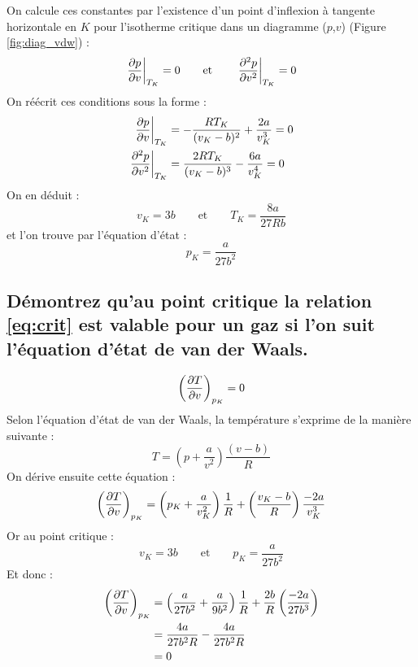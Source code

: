 On calcule ces constantes par l'existence d'un point d'inflexion à tangente horizontale en $K$ pour l'isotherme critique dans un diagramme ($p$,$v$) (Figure \ref{fig:diag_vdw}) : 
\begin{equation} \left.\frac{\partial p}{\partial v}\right|_{T_K} = 0 \qquad \text{et} \qquad \left.\frac{\partial^2 p}{\partial v^2}\right|_{T_K} = 0 \end{equation}
On réécrit ces conditions sous la forme :
\begin{align} \left.\frac{\partial p}{\partial v}\right|_{T_K} &= -\frac{RT_K}{(v_K - b)^2} + \frac{2a}{v^3_K} = 0 \\ \left.\frac{\partial^2 p}{\partial v^2}\right|_{T_K} &= \frac{2RT_K}{(v_K - b)^3} - \frac{6a}{v^4_K} = 0 \end{align}
On en déduit :
\begin{equation} v_K = 3b \qquad \text{et} \qquad T_K = \frac{8a}{27Rb} \end{equation}
et l'on trouve par l'équation d'état :
\begin{equation} p_K = \frac{a}{27b^2} \end{equation}

\subsection{Démontrez qu'au point critique la relation \ref{eq:crit} est valable pour un gaz si l'on suit l'équation d'état de van der Waals.}
\begin{equation} \left(\frac{\partial T}{\partial v}\right)_{p_K} = 0 \label{eq:crit} \end{equation}
Selon l'équation d'état de van der Waals, la température s'exprime de la manière suivante :
\begin{equation} T = \left(p + \frac{a}{v^2}\right)\frac{(v-b)}{R} \end{equation}
On dérive ensuite cette équation :
\begin{equation} \left(\frac{\partial T}{\partial v}\right)_{p_K} = \left(p_K + \frac{a}{v^2_K}\right)\frac{1}{R} + \left(\frac{v_K-b}{R}\right)\frac{-2a}{v^3_K} \end{equation}
Or au point critique :
\begin{equation} v_K = 3b \qquad \text{et} \qquad p_K = \frac{a}{27b^2} \end{equation}
Et donc :
\begin{align} \left(\frac{\partial T}{\partial v}\right)_{p_K} &= \left(\frac{a}{27b^2} + \frac{a}{9b^2}\right)\frac{1}{R} + \frac{2b}{R}\left(\frac{-2a}{27b^3}\right) \\ &= \frac{4a}{27b^2R} - \frac{4a}{27b^2R} \\ &= 0 \end{align}

